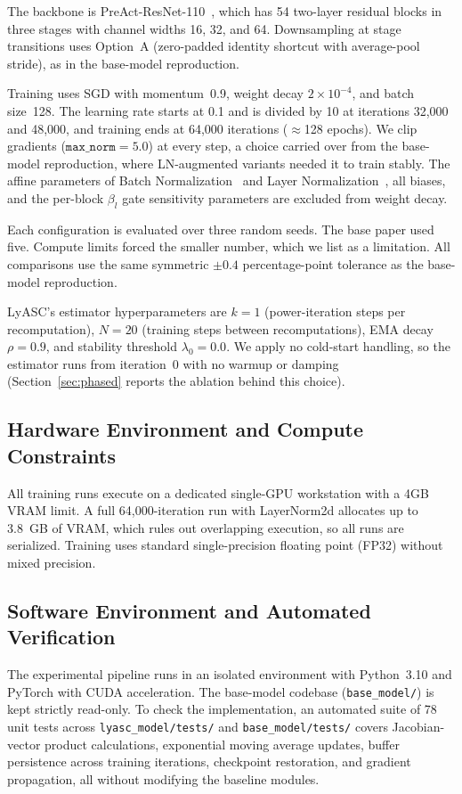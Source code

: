 \documentclass[conference,10pt]{IEEEtran}
\begin{document}
The backbone is PreAct-ResNet-110~\cite{he2016identity}, which has 54
two-layer residual blocks in three stages with channel widths 16, 32,
and 64. Downsampling at stage transitions uses Option~A (zero-padded
identity shortcut with average-pool stride), as in the base-model
reproduction.

Training uses SGD with momentum~0.9, weight decay $2 \times 10^{-4}$,
and batch size~128. The learning rate starts at 0.1 and is divided by 10
at iterations 32,000 and 48,000, and training ends at 64,000 iterations
($\approx$128 epochs). We clip gradients
($\texttt{max\_norm} = 5.0$) at every step, a choice carried over from
the base-model reproduction, where LN-augmented variants needed it to
train stably. The affine parameters of Batch
Normalization~\cite{ioffe2015batch} and Layer
Normalization~\cite{ba2016layer}, all biases, and the per-block
$\beta_l$ gate sensitivity parameters are excluded from weight decay.

Each configuration is evaluated over three random seeds. The base paper
used five. Compute limits forced the smaller number, which we list as a
limitation. All comparisons use the same symmetric $\pm 0.4$
percentage-point tolerance as the base-model reproduction.

LyASC's estimator hyperparameters are $k = 1$ (power-iteration steps
per recomputation), $N = 20$ (training steps between recomputations),
EMA decay $\rho = 0.9$, and stability threshold $\lambda_0 = 0.0$. We
apply no cold-start handling, so the estimator runs from iteration~0 with
no warmup or damping (Section~\ref{sec:phased} reports the ablation
behind this choice).

\subsection{Hardware Environment and Compute Constraints}

All training runs execute on a dedicated single-GPU workstation with a
4GB VRAM limit. A full 64,000-iteration run with LayerNorm2d
allocates up to 3.8~GB of VRAM, which rules out overlapping execution, so
all runs are serialized. Training uses standard single-precision
floating point (FP32) without mixed precision.

\subsection{Software Environment and Automated Verification}

The experimental pipeline runs in an isolated environment with Python~3.10
and PyTorch with CUDA acceleration. The base-model codebase
(\texttt{base\_model/}) is kept strictly read-only.
To check the implementation, an automated suite of
78 unit tests across \texttt{lyasc\_model/tests/} and \texttt{base\_model/tests/}
covers Jacobian-vector product calculations, exponential moving average updates,
buffer persistence across training iterations, checkpoint restoration, and
gradient propagation, all without modifying the baseline modules.
\end{document}
